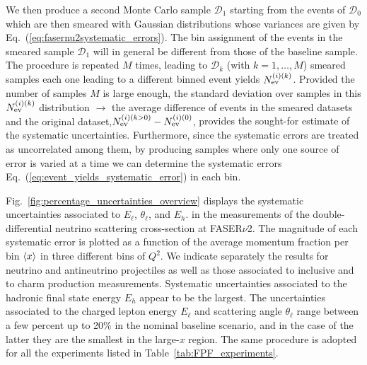 We then produce a second Monte Carlo sample $\mathcal{D}_1$ starting from the events
of $\mathcal{D}_0$ which are then smeared with Gaussian distributions whose variances
are given by Eq.~(\ref{eq:fasernu2systematic_errors}).
%
The bin assignment of the events in the smeared sample $\mathcal{D}_1$ will
in general be different from those of the baseline sample.
%
The procedure is repeated $M$ times, leading to
$\mathcal{D}_k$ (with $k=1,\ldots,M$) smeared
samples each one leading to a different binned event yields
$ N_{\rm ev}^{(i)(k)}$.
%
Provided the number of samples $M$ is large enough,  {\color{red} the standard deviation over samples in this $ N_{\rm ev}^{(i)(k)}$
distribution}{\color{blue} $\rightarrow$ the average difference of events in the smeared datasets and the original dataset,$ N_{\rm ev}^{(i)(k>0)} -  N_{\rm ev}^{(i)(0)}$,} provides the sought-for estimate of the systematic uncertainties.
%
Furthermore, 
since the systematic errors are treated as uncorrelated among them,
by producing samples where only one source of error is varied at a time
we can determine the systematic errors Eq.~(\ref{eq:event_yields_systematic_error}) in each bin.

Fig.~\ref{fig:percentage_uncertainties_overview}
displays the systematic uncertainties associated
to $E_\ell$, $\theta_\ell$, and $E_h$.
in the  measurements
of the double-differential
neutrino scattering cross-section at FASER$\nu$2.
%
The magnitude of each systematic error is plotted as a function
of the average momentum fraction per bin $\left\langle x\right\rangle$
in three different bins of $Q^2$.
%
We indicate separately the results for neutrino and antineutrino projectiles as well as
those associated to inclusive and to charm production measurements.
%
Systematic uncertainties associated to the hadronic final state energy $E_h$ appear to be the largest.
%
The uncertainties associated to the charged lepton energy $E_\ell$ and scattering angle $\theta_\ell$ range
between a few percent up to 20\% in the nominal baseline scenario,
and in the case of the latter they are the smallest in the large-$x$ region.
%
The same procedure is adopted for all the experiments listed in Table~\ref{tab:FPF_experiments}.

